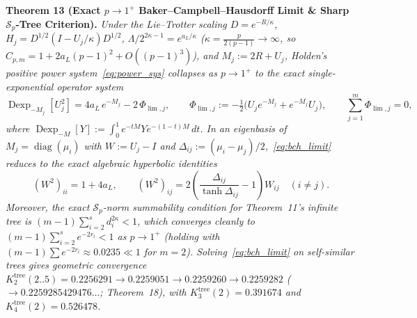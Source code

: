 \documentclass[10pt,letterpaper]{article}
\newcommand{\Sp}{\mathcal{S}_p}
\newcommand{\diag}{\operatorname{diag}}
\begin{document}
\begin{tcolorbox}[mathbox]
\textbf{Theorem 13 (Exact $p \to 1^+$ Baker--Campbell--Hausdorff Limit \& Sharp $\Sp$-Tree Criterion).}
\emph{Under the Lie--Trotter scaling $D = e^{-R/\kappa}$, $H_j = D^{1/2}(I - U_j/\kappa)D^{1/2}$, $\Lambda / 2^{2\kappa-1} = e^{a_L/\kappa}$ ($\kappa = \frac{p}{2(p-1)} \to \infty$, so $C_{p,m} = 1 + 2a_L(p-1)^2 + O((p-1)^3)$), and $M_j := 2R + U_j$, Holden's positive power system~\eqref{eq:power_sys} collapses as $p \to 1^+$ to the exact single-exponential operator system}
\begin{equation}\label{eq:bch_limit}
  \operatorname{Dexp}_{-M_j}[U_j^2] = 4a_L\, e^{-M_j} - 2\,\Phi_{\lim,j},
  \qquad
  \Phi_{\lim,j} := -\tfrac{1}{2}\bigl(U_j e^{-M_j} + e^{-M_j} U_j\bigr),
  \qquad \sum_{j=1}^m \Phi_{\lim,j} = 0,
\end{equation}
\emph{where $\operatorname{Dexp}_{-M}[Y] := \int_0^1 e^{-tM} Y e^{-(1-t)M}\,dt$. In an eigenbasis of $M_j = \diag(\mu_i)$ with $W := U_j - I$ and $\Delta_{ij} := (\mu_i - \mu_j)/2$,~\eqref{eq:bch_limit} reduces to the exact algebraic hyperbolic identities}
\[
  (W^2)_{ii} = 1 + 4a_L,
  \qquad
  (W^2)_{ij} = 2\left(\frac{\Delta_{ij}}{\tanh \Delta_{ij}} - 1\right) W_{ij} \quad (i \neq j).
\]
\emph{Moreover, the exact $\Sp$-norm summability condition for Theorem~11's infinite tree is $(m - 1)\sum_{i=2}^s d_i^{2\kappa} < 1$, which converges cleanly to $(m-1)\sum_{i=2}^s e^{-2r_i} < 1$ as $p \to 1^+$ (holding with $(m-1)\sum e^{-2r_i} \approx 0.0235 \ll 1$ for $m = 2$). Solving~\eqref{eq:bch_limit} on self-similar trees gives geometric convergence $K_2^{\mathrm{tree}}(2..5) = 0.2256291 \to 0.2259051 \to 0.2259260 \to 0.2259282$ ($\to 0.2259285429476\dots$; Theorem~18), with $K_3^{\mathrm{tree}}(2) = 0.391674$ and $K_4^{\mathrm{tree}}(2) = 0.526478$.}
\end{tcolorbox}
\end{document}
